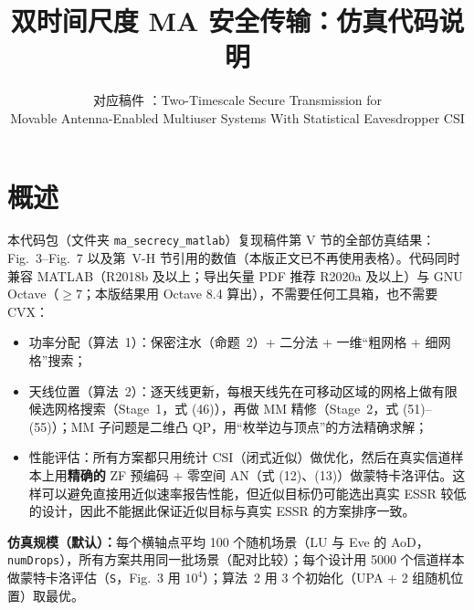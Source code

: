 \documentclass[11pt,a4paper]{ctexart}
\title{双时间尺度 MA 安全传输：仿真代码说明}
\author{对应稿件 \code{main.tex}：Two-Timescale Secure Transmission for\\ Movable Antenna-Enabled Multiuser Systems With Statistical Eavesdropper CSI}
\date{}
\newcommand{\code}[1]{\texttt{#1}}
\begin{document}
\sloppy
\maketitle
\tableofcontents

\section{概述}
本代码包（文件夹 \code{ma\_secrecy\_matlab}）复现稿件第 V 节的全部仿真结果：Fig.~3--Fig.~7 以及第~V-H 节引用的数值（本版正文已不再使用表格）。代码同时兼容 MATLAB（R2018b 及以上；导出矢量 PDF 推荐 R2020a 及以上）与 GNU Octave（$\ge 7$；本版结果用 Octave 8.4 算出），不需要任何工具箱，也不需要 CVX：
\begin{itemize}
\item 功率分配（算法~1）：保密注水（命题~2）+ 二分法 + 一维“粗网格 + 细网格”搜索；
\item 天线位置（算法~2）：逐天线更新，每根天线先在可移动区域的网格上做有限候选网格搜索（Stage~1，式 (46)），再做 MM 精修（Stage~2，式 (51)--(55)）；MM 子问题是二维凸 QP，用“枚举边与顶点”的方法精确求解；
\item 性能评估：所有方案都只用统计 CSI（闭式近似）做优化，然后在真实信道样本上用\textbf{精确的} ZF 预编码 + 零空间 AN（式 (12)、(13)）做蒙特卡洛评估。这样可以避免直接用近似速率报告性能，但近似目标仍可能选出真实 ESSR 较低的设计，因此不能据此保证近似目标与真实 ESSR 的方案排序一致。
\end{itemize}

\textbf{仿真规模（默认）：}每个横轴点平均 100 个随机场景（LU 与 Eve 的 AoD，\code{numDrops}），所有方案共用同一批场景（配对比较）；每个设计用 5000 个信道样本做蒙特卡洛评估（\code{S}，Fig.~3 用 $10^4$）；算法~2 用 3 个初始化（UPA + 2 组随机位置）取最优。

\end{document}
